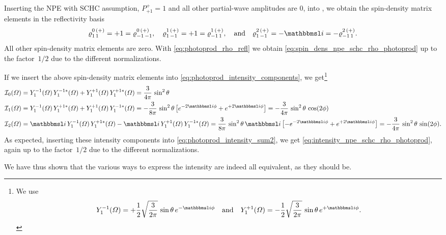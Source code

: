 Inserting the NPE with SCHC assumption, \ie $P^+_{+1} = 1$ and all
other partial-wave amplitudes are 0, into
, we
obtain the spin-density matrix elements in the reflectivity basis
\begin{equation}
  \varrho^{0\, (+)}_{1\, 1}
  = +1
  = \varrho^{0\, (+)}_{{-1}\, {-1}},
  \quad
  \varrho^{1\, (+)}_{1\, {-1}}
  = +1
  = \varrho^{1\, (+)}_{{-1}\, 1},
  \quad\text{and}\quad
  \varrho^{2\, (+)}_{1\, {-1}}
  = -\imag
  = -\varrho^{2\, (+)}_{{-1}\, 1}.
\end{equation}
All other spin-density matrix elements are zero.  With
\cref{eq:photoprod_rho_refl} we obtain
\cref{eq:spin_dens_npe_schc_rho_photoprod} up to the factor~$1 / 2$
due to the different normalizations.

If we insert the above spin-density matrix elements into
\cref{eq:photoprod_intensity_components}, we get\footnote{%
  We use
  \begin{equation}
    Y_1^{-1}(\Omega)
    = +\frac{1}{2} \sqrt{\frac{3}{2 \pi}}\, \sin \theta\, e^{-\imag \phi}
    \quad\text{and}\quad
    Y_1^{+1}(\Omega)
    = -\frac{1}{2} \sqrt{\frac{3}{2 \pi}}\, \sin \theta\, e^{+\imag \phi}.
  \end{equation}
}
\begin{align*}
  \intensity_0(\Omega)
  ={}& Y_1^{-1}(\Omega)\, Y_1^{-1 *}(\Omega) + Y_1^{+1}(\Omega)\, Y_1^{+1 *}(\Omega)
  = \frac{3}{4 \pi}\, \sin^2 \theta
  \\
  \intensity_1(\Omega)
  ={}& Y_1^{-1}(\Omega)\, Y_1^{+1 *}(\Omega) + Y_1^{+1}(\Omega)\, Y_1^{-1 *}(\Omega)
  = -\frac{3}{8 \pi}\, \sin^2 \theta \sBrk[1]{e^{-2 \imag \phi} + e^{+2 \imag \phi}}
  = -\frac{3}{4 \pi}\, \sin^2 \theta\, \cos(2 \phi)
  \\
  \intensity_2(\Omega)
  ={}& \imag\, Y_1^{-1}(\Omega)\, Y_1^{+1 *}(\Omega) - \imag\, Y_1^{+1}(\Omega)\, Y_1^{-1 *}(\Omega)
  = \frac{3}{8 \pi}\, \sin^2 \theta\, \imag \sBrk[1]{-e^{-2 \imag \phi} + e^{+2 \imag \phi}}
  = -\frac{3}{4 \pi}\, \sin^2 \theta\, \sin(2 \phi).
\end{align*}
As expected, inserting these intensity components into
\cref{eq:photoprod_intensity_sum2}, we get
\cref{eq:intensity_npe_schc_rho_photoprod}, again up to the factor~$1
/ 2$ due to the different normalizations.

We have thus shown that the various ways to express the intensity are
indeed all equivalent, as they should be.
